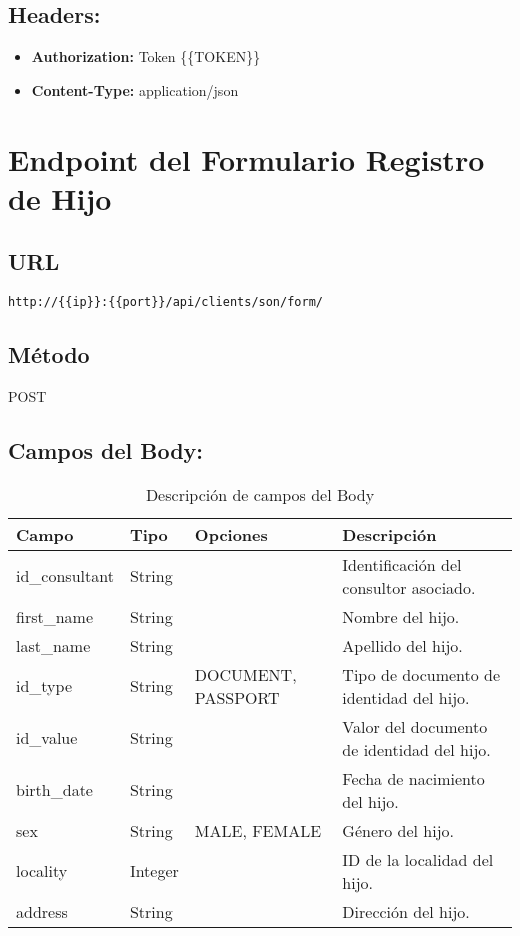 \subsection*{Headers:}

\begin{itemize}
    \item \textbf{Authorization:} Token \{\{TOKEN\}\}
    \item \textbf{Content-Type:} application/json
\end{itemize}






\section{Endpoint del Formulario Registro de Hijo}

\subsection*{URL}
\texttt{http://\{\{ip\}\}:\{\{port\}\}/api/clients/son/form/}

\subsection*{Método}
POST

\subsection*{Campos del Body:}

\begin{table}[H]
    \centering
    \begin{tabular}{|l|l|l|p{7cm}|}
        \hline
        \textbf{Campo} & \textbf{Tipo} & \textbf{Opciones} & \textbf{Descripción} \\ \hline
        id\_consultant & String & & Identificación del consultor asociado. \\ \hline
        first\_name & String & & Nombre del hijo. \\ \hline
        last\_name & String & & Apellido del hijo. \\ \hline
        id\_type & String & DOCUMENT, PASSPORT & Tipo de documento de identidad del hijo. \\ \hline
        id\_value & String & & Valor del documento de identidad del hijo. \\ \hline
        birth\_date & String & & Fecha de nacimiento del hijo. \\ \hline
        sex & String & MALE, FEMALE & Género del hijo. \\ \hline
        locality & Integer & & ID de la localidad del hijo. \\ \hline
        address & String & & Dirección del hijo. \\ \hline
    \end{tabular}
    \caption{Descripción de campos del Body}
    \label{tab:body-fields-son}
\end{table}


